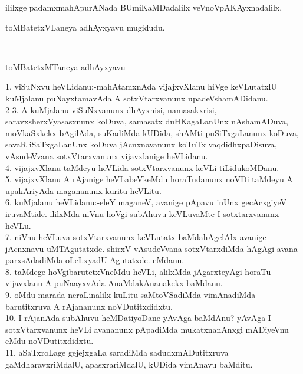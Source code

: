 \documentclass{article}
\begin{document}
\begin{center}
ililxge padamxmahApurANada BUmiKaMDadalilx veVnoVpAKAyxnadalilx,
\end{center}

\begin{center}
toMBatetxVLaneya adhAyxyavu mugidudu.
\end{center}

\begin{center}
---------------
\end{center}

\begin{center}
toMBatetxMTaneya adhAyxyavu
\end{center}

1. viSuNxvu heVLidanu:-mahAtamxnAda vijajxvXlanu hiVge keVLutatxlU kuMjalanu puNayxtamavAda A sotxVtarxvanunx upadeVshamADidanu.\\
2-3.  A kuMjalanu viSuNxvanunx dhAyxnisi, namasakxrisi, saravxsherxVyasasxnunx koDuva, samasatx duHKagaLanUnx nAshamADuva, moVkaSxkekx bAgilAda, suKadiMda kUDida, shAMti puSiTxgaLanunx koDuva, savaR iSaTxgaLanUnx koDuva jAcnxnavanunx koTuTx vaqdidhxpaDisuva, vAsudeVvana sotxVtarxvanunx vijavxlanige heVLidanu.\\
4. vijajxvXlanu taMdeyu heVLida sotxVtarxvanunx keVLi tiLidukoMDanu.\\
5. vijajxvXlanu A rAjanige heVLabeVkeMdu horaTudanunx noVDi taMdeyu A upakAriyAda magananunx kuritu heVLitu.\\
6. kuMjalanu heVLidanu:-eleY maganeV, avanige pApavu inUnx gecAcxgiyeV iruvaMtide. ililxMda niVnu hoVgi subAhuvu keVLuvaMte I sotxtarxvanunx heVLu.\\
7. niVnu heVLuva sotxVtarxvanunx keVLutatx baMdahAgelAlx avanige jAcnxnavu uMTAgutatxde. shirxV vAsudeVvana sotxVtarxdiMda hAgAgi avana parxsAdadiMda oLeLxyadU Agutatxde. eMdanu.\\
8. taMdege hoVgibarutetxVneMdu heVLi, alilxMda jAgarxteyAgi horaTu vijavxlanu A puNaayxvAda AnaMdakAnanakekx baMdanu.\\
9. oMdu marada  neraLinalilx kuLitu saMtoVSadiMda vimAnadiMda barutitxruva A rAjananunx noVDutitxdidxtu.\\
10. I rAjanAda subAhuvu heMDatiyoDane yAvAga baMdAnu? yAvAga I sotxVtarxvanunx heVLi avananunx pApadiMda mukatxnanAnxgi mADiyeVnu eMdu noVDutitxdidxtu.\\
11. aSaTxroLage gejejxgaLa saradiMda  sadudxmADutitxruva gaMdharavxriMdalU, apasxrariMdalU, kUDida vimAnavu baMditu.\\
\end{document}
